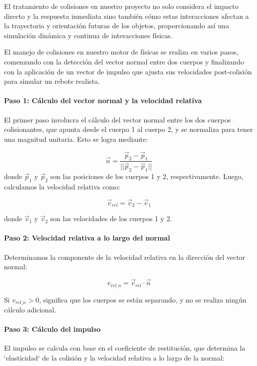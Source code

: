 El tratamiento de colisiones en nuestro proyecto no solo considera el impacto directo y la respuesta inmediata sino también cómo estas interacciones afectan a la trayectoria y orientación futuras de los objetos, proporcionando así una simulación dinámica y continua de interacciones físicas.

El manejo de colisiones en nuestro motor de físicas se realiza en varios pasos, comenzando con la detección del vector normal entre dos cuerpos y finalizando con la aplicación de un vector de impulso que ajusta sus velocidades post-colisión para simular un rebote realista.

\paragraph{Paso 1: Cálculo del vector normal y la velocidad relativa}
El primer paso involucra el cálculo del vector normal entre los dos cuerpos colisionantes, que apunta desde el cuerpo 1 al cuerpo 2, y se normaliza para tener una magnitud unitaria. Esto se logra mediante:

\begin{equation}
\label{eq4}
    \vec{n} = \frac{\vec{p}_2 - \vec{p}_1}{||\vec{p}_2 - \vec{p}_1||}
\end{equation}
donde \(\vec{p}_1\) y \(\vec{p}_2\) son las posiciones de los cuerpos 1 y 2, respectivamente. Luego, calculamos la velocidad relativa como:


\begin{equation}
\label{eq5}
    \vec{v}_{rel} = \vec{v}_2 - \vec{v}_1
\end{equation}

donde \(\vec{v}_1\) y \(\vec{v}_2\) son las velocidades de los cuerpos 1 y 2.

\paragraph{Paso 2: Velocidad relativa a lo largo del normal}
Determinamos la componente de la velocidad relativa en la dirección del vector normal:

\begin{equation}
\label{eq6}
    v_{rel\_n} = \vec{v}_{rel} \cdot \vec{n}
\end{equation}

Si \(v_{rel\_n} > 0\), significa que los cuerpos se están separando, y no se realiza ningún cálculo adicional.

\paragraph{Paso 3: Cálculo del impulso}
El impulso se calcula con base en el coeficiente de restitución, que determina la `elasticidad` de la colisión y la velocidad relativa a lo largo de la normal:

